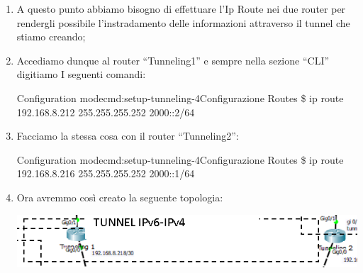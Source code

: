 \begin{enumerate}
    \item A questo punto abbiamo bisogno di effettuare l’Ip Route nei due router per rendergli possibile l’instradamento delle informazioni attraverso il tunnel che stiamo creando;
    \item Accediamo dunque al router “Tunneling1” e sempre nella sezione “CLI” digitiamo I seguenti comandi:\par
    \begin{cmds}{Configuration mode}{cmd:setup-tunneling-4}{Configurazione Routes}
        \$ ip route 192.168.8.212 255.255.255.252 2000::2/64
    \end{cmds}
    \item Facciamo la stessa cosa con il router “Tunneling2”:\par
    \begin{cmds}{Configuration mode}{cmd:setup-tunneling-4}{Configurazione Routes}
        \$ ip route 192.168.8.216 255.255.255.252 2000::1/64
    \end{cmds}
    \item Ora avremmo così creato la seguente topologia:\par
    \begin{center}
        \includegraphics[width=\linewidth]{images/07.routing-sicurezza/tunneling/11.png}
    \end{center}
\end{enumerate}
